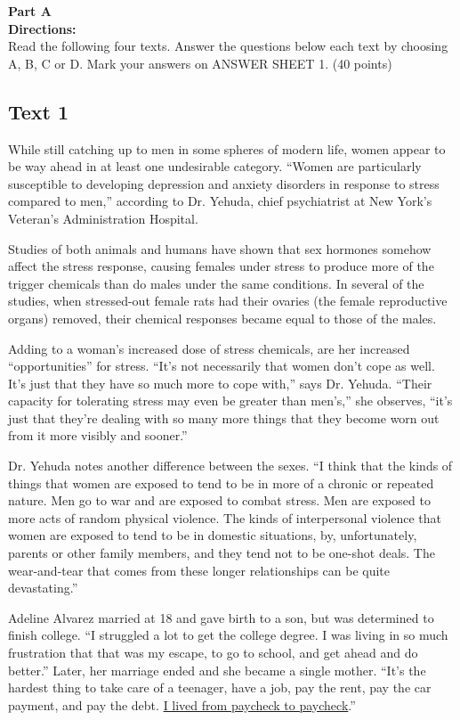 \noindent
\textbf{Part A}\\
\textbf{Directions:}\\
Read the following four texts. Answer the questions below each
text by choosing A, B, C or
D. Mark your answers
on ANSWER SHEET 1. (40 points)


\newpage
\subsection{Text 1}


While still catching up to men in some spheres of modern life, women
appear to be way ahead in at least one undesirable category. ``Women are
particularly susceptible to developing depression and anxiety disorders
in response to stress compared to men,'' according to Dr. Yehuda, chief
psychiatrist at New York's Veteran's Administration Hospital.

Studies of both animals and humans have shown that sex hormones somehow
affect the stress response, causing females under stress to produce more
of the trigger chemicals than do males under the same conditions. In
several of the studies, when stressed-out female rats had their ovaries
(the female reproductive organs) removed, their chemical responses
became equal to those of the males.

Adding to a woman's increased dose of stress chemicals, are her
increased ``opportunities'' for stress. ``It's not necessarily that
women don't cope as well. It's just that they have so much more to cope
with,'' says Dr. Yehuda. ``Their capacity for tolerating stress may even
be greater than men's,'' she observes, ``it's just that they're dealing
with so many more things that they become worn out from it more visibly
and sooner.''

Dr. Yehuda notes another difference between the sexes. ``I think that
the kinds of things that women are exposed to tend to be in more of a
chronic or repeated nature. Men go to war and are exposed to combat
stress. Men are exposed to more acts of random physical violence. The
kinds of interpersonal violence that women are exposed to tend to be in
domestic situations, by, unfortunately, parents or other family members,
and they tend not to be one-shot deals. The wear-and-tear that comes
from these longer relationships can be quite devastating.''

Adeline Alvarez married at 18 and gave birth to a son, but was
determined to finish college. ``I struggled a lot to get the college
degree. I was living in so much frustration that that was my escape, to
go to school, and get ahead and do better.'' Later, her marriage ended
and she became a single mother. ``It's the hardest thing to take care of
a teenager, have a job, pay the rent, pay the car payment, and pay the
debt. \uline{I lived from paycheck to paycheck}.''

